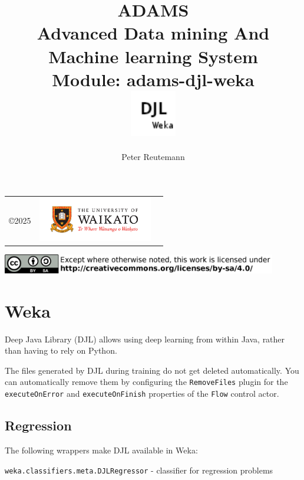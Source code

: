 \documentclass[a4paper]{book}
\title{
  \textbf{ADAMS} \\
  {\Large \textbf{A}dvanced \textbf{D}ata mining \textbf{A}nd \textbf{M}achine
  learning \textbf{S}ystem} \\
  {\Large Module: adams-djl-weka} \\
  \vspace{1cm}
  \includegraphics[width=2cm]{images/djl-weka-module.png} \\
}
\author{
  Peter Reutemann
}
\begin{document}
\begin{titlepage}
\maketitle

\thispagestyle{empty}
\center
\begin{table}[b]
	\begin{tabular}{c l l}
		\parbox[c][2cm]{2cm}{\copyright 2025} &
		\parbox[c][2cm]{5cm}{\includegraphics[width=5cm]{images/coat_of_arms.pdf}} \\
	\end{tabular}
	\includegraphics[width=12cm]{images/cc.png} \\
\end{table}

\end{titlepage}

\tableofcontents

\chapter{Weka}
Deep Java Library (DJL)\cite{djl} allows using deep learning from within Java, rather than having to rely on Python.

The files generated by DJL during training do not get deleted automatically. You can
automatically remove them by configuring the \texttt{RemoveFiles} plugin for the \texttt{executeOnError} and
\texttt{executeOnFinish} properties of the \texttt{Flow} control actor.

\section{Regression}
The following wrappers make DJL available in Weka\cite{weka}:
\begin{tight_itemize}
    \item \texttt{weka.classifiers.meta.DJLRegressor} - classifier for regression problems
\end{tight_itemize}


\end{document}

